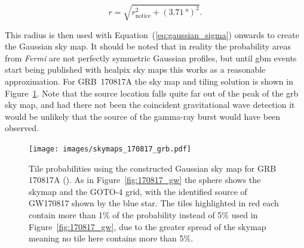 \begin{colsection}
\begin{colsection}
\begin{equation}
    r = \sqrt{r_\text{notice}^2 + {(\SI{3.71}{\degree})}^2}.
    \label{eq:fermi_radius}
\end{equation}

This radius is then used with Equation~(\ref{eq:gaussian_sigma}) onwards to create the Gaussian sky map. It should be noted that in reality the probability areas from \textit{Fermi} are not perfectly symmetric Gaussian profiles, but until \gls{gbm} events start being published with \gls{healpix} sky maps this works as a reasonable approximation. For GRB~170817A the sky map and tiling solution is shown in Figure~\ref{fig:170817_grb}. Note that the source location falls quite far out of the peak of the \gls{grb} sky map, and had there not been the coincident gravitational wave detection it would be unlikely that the source of the gamma-ray burst would have been observed.

\begin{figure}[p]
\begin{center}
\texttt{[image: images/skymaps\_170817\_grb.pdf]}
\end{center}
\caption[Tile probabilities for GRB 170817A]{Tile probabilities using the constructed Gaussian sky map for GRB 170817A (\cite{GW170817_Fermi}). As in Figure~\ref{fig:170817_gw} the sphere shows the skymap and the GOTO-4 grid, with the identified source of GW170817 shown by the blue star. The tiles highlighted in red each contain more than 1\% of the probability instead of 5\% used in Figure~\ref{fig:170817_gw}, due to the greater spread of the skymap meaning no tile here contains more than 5\%.
}
\label{fig:170817_grb}
\end{figure}

\end{colsection}


\end{colsection}


\newpage
